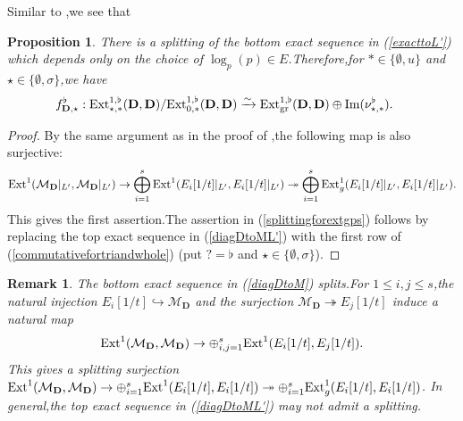 \documentclass[10pt]{article}
\newtheorem{pro}[thm]{Proposition}
\newtheorem{rmk}[thm]{Remark}
\newcommand{\ext}{{\rm Ext}}
\newcommand{\gr}{{\rm gr}}
\newcommand{\Dpik}{{\mathbf{D}}}
\newcommand{\cM}{\mathcal M}
\begin{document}
Similar to \cite[Proposition 2.4.4]{BDcritical25},\;we see that
\begin{pro}\label{splitingforext1gps}
	There is a splitting of the bottom exact sequence in (\ref{exacttoL'}) which depends only on the choice of $\log_p(p)\in E$.\;Therefore,\;for $\ast\in \{\emptyset,u\}$ and $\star\in\{\emptyset,\sigma\}$,\;we have 
	\begin{equation}\label{splittingforextgps}
		\begin{aligned}
			&f^{\flat}_{\Dpik,\star}:{\ext}^{1,\flat}_{\star,\ast}(\Dpik,\Dpik)/{\ext}^{1,\flat}_{0,\ast}(\Dpik,\Dpik)\xrightarrow{\sim}\ext^{1,\flat}_{\gr}({\Dpik},{\Dpik})\oplus\mathrm{Im}(\nu^{\flat}_{\star,\ast}).\;
		\end{aligned}
	\end{equation}
\end{pro}
\begin{proof}By the same argument as in the proof of \cite[Proposition 2.4.4]{BDcritical25},\;the following map is also surjective:
\[\ext^{1}(\cM_{\Dpik}|_{L'},\cM_{\Dpik}|_{L'})\rightarrow \bigoplus_{i=1}^s\ext^{1}(E_i[1/t]|_{L'},E_i[1/t]|_{L'})\twoheadrightarrow \bigoplus_{i=1}^s\ext^{1}_g(E_i[1/t]|_{L'},E_i[1/t]|_{L'}).\]
	This gives the first assertion.\;The assertion in (\ref{splittingforextgps}) follows by replacing the top exact sequence in (\ref{diagDtoML'}) with the first row of  (\ref{commutativefortriandwhole}) (put $?=\flat$ and $\star\in\{\emptyset,\sigma\}$).\;
\end{proof}
\begin{rmk}The bottom exact sequence in (\ref{diagDtoM})
splits.\;For $1\leq i,j\leq s$,\;the natural injection $E_i[1/t]\hookrightarrow \cM_{\Dpik}$ and the surjection $\cM_{\Dpik}\twoheadrightarrow E_j[1/t]$ induce a natural map 
\[\ext^{1}(\cM_{\Dpik},\cM_{\Dpik})\rightarrow \oplus_{i,j=1}^s\ext^{1}(E_i[1/t],E_j[1/t]).\]	
This gives a splitting surjection $\ext^{1}(\cM_{\Dpik},\cM_{\Dpik})\rightarrow \oplus_{i=1}^s\ext^{1}(E_i[1/t],E_i[1/t])\twoheadrightarrow \oplus_{i=1}^s\ext^{1}_g(E_i[1/t],E_i[1/t])$. In general,\;the top exact sequence in (\ref{diagDtoML'}) may not admit a splitting.\;
\end{rmk}
\end{document}
